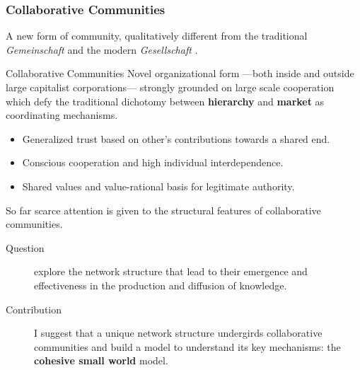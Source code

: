 \documentclass[ignorenonframetext,red,8pt,notes=hide]{beamer}
\begin{document}
\begin{frame}
\frametitle{Collaborative Communities}
A new form of community, qualitatively different from the traditional \emph{Gemeinschaft} and the modern \emph{Gesellschaft} \citep{tonnies:1974}. 

\begin{block}{Collaborative Communities \citep{adler:2006}}
Novel organizational form ---both inside and outside large capitalist corporations--- strongly grounded on large scale cooperation which defy the traditional dichotomy between \textbf{hierarchy} and \textbf{market} as coordinating mechanisms.

\begin{itemize}
\item Generalized trust based on other's contributions towards a shared end.
\item Conscious cooperation and high individual interdependence.
\item Shared values and value-rational basis for legitimate authority. 
\end{itemize}
\end{block}

\pause

So far scarce attention is given to the structural features of collaborative communities.

\begin{description}
\item[Question] explore the network structure that lead to their emergence and effectiveness in the production and diffusion of knowledge.

\item[Contribution] I suggest that a unique network structure undergirds collaborative communities and build a model to understand its key mechanisms: the \textbf{cohesive small world} model.
\end{description}

\end{frame}
\end{document}

